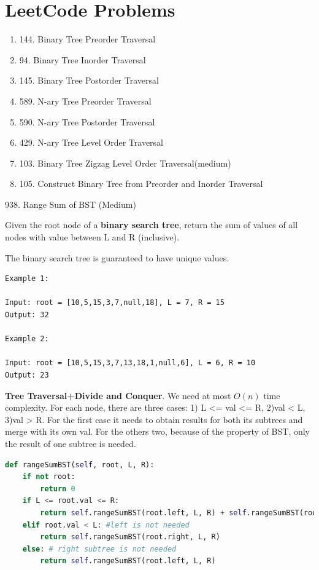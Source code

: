 \documentclass[../main.tex]{subfiles}
\begin{document}
\section{LeetCode Problems}

\begin{enumerate}
    \item 144. Binary Tree Preorder Traversal
    \item 94. Binary Tree Inorder Traversal
    \item 145. Binary Tree Postorder Traversal
    \item 589. N-ary Tree Preorder Traversal
    \item 590. N-ary Tree Postorder Traversal
    \item 429. N-ary Tree Level Order Traversal
    \item 103. Binary Tree Zigzag Level Order Traversal(medium)
    \item 105. Construct Binary Tree from Preorder and Inorder Traversal
\end{enumerate}

938. Range Sum of BST (Medium)

Given the root node of a \textbf{binary search tree}, return the sum of values of all nodes with value between L and R (inclusive).

The binary search tree is guaranteed to have unique values.
\begin{lstlisting}
Example 1:

Input: root = [10,5,15,3,7,null,18], L = 7, R = 15
Output: 32

Example 2:

Input: root = [10,5,15,3,7,13,18,1,null,6], L = 6, R = 10
Output: 23
\end{lstlisting}
\textbf{Tree Traversal+Divide and Conquer}. We need at most $O(n)$ time complexity. For each node, there are three cases: 1) L <= val <= R, 2)val < L, 3)val > R. For the first case it needs to obtain results for both its subtrees and merge with its own val. For the others two, because of the property of BST, only the result of one subtree is needed. 
\begin{lstlisting}[language=Python]
def rangeSumBST(self, root, L, R):
    if not root:
        return 0
    if L <= root.val <= R:
        return self.rangeSumBST(root.left, L, R) + self.rangeSumBST(root.right, L, R) + root.val
    elif root.val < L: #left is not needed
        return self.rangeSumBST(root.right, L, R)
    else: # right subtree is not needed
        return self.rangeSumBST(root.left, L, R)
\end{lstlisting}
\end{document}
